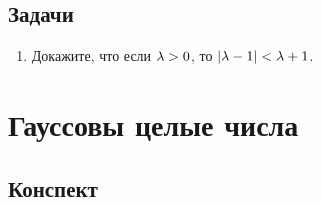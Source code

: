 \subsection*{Задачи}

\begin{enumerate}
\item Докажите, что если $\lambda>0$, то $|\lambda-1|<\lambda+1$.
\end{enumerate}


\section{Гауссовы целые числа}

\subsection*{Конспект}

